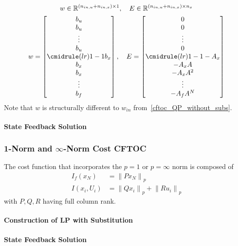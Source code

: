 \begin{gather*}
    w \in \mathbb{R}^{(n_{in,u} + n_{in,x})\times 1},\quad E \in \mathbb{R}^{(n_{in,u} + n_{in,x})\times n_x}\\
    w = \begin{bmatrix}
        b_u                    \\
        b_u                    \\
        \vdots                 \\
        b_u                    \\
        \cmidrule(lr){1-1} b_x \\
        b_x                    \\
        b_x                    \\
        \vdots                 \\
        b_f
    \end{bmatrix}, \quad
    E = \begin{bmatrix}
        0                       \\
        0                       \\
        \vdots                  \\
        0                       \\
        \cmidrule(lr){1-1} -A_x \\
        -A_x A                  \\
        -A_x A^2                \\
        \vdots                  \\
        -A_f A^N
    \end{bmatrix}
\end{gather*}
Note that $w$ is structurally different to $w_{in}$ from~\ref{cftoc_QP_without_subs}.

\paragraph{State Feedback Solution}


\subsubsection[1-Norm and Inf-Norm Cost]{1-Norm and $\infty$-Norm Cost CFTOC}

The cost function that incorporates the $p=1$ or $p=\infty$ norm is composed of
\begin{align*}
    I_f(x_N)   & = {\lVert Px_N \rVert}_p                          \\
    I(x_i,U_i) & = {\lVert Qx_i \rVert}_p + {\lVert Ru_i \rVert}_p
\end{align*}
with $P,Q,R$ having full column rank.


\paragraph{Construction of LP with Substitution}


\paragraph{State Feedback Solution}

